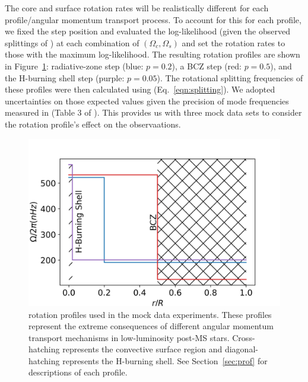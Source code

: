 The core and surface rotation rates will be realistically different for each profile/angular momentum transport process. To account for this for each profile, we fixed the step position and evaluated the log-likelihood (given the observed splittings of \thestar) at each combination of $(\Omega_c,\Omega_s)$ and set the rotation rates to those with the maximum log-likelihood. The resulting rotation profiles are shown in Figure~\ref{fig:5rotprof}: radiative-zone step (blue: $p = 0.2$), a BCZ step (red: $p = 0.5$), and the H-burning shell step (purple: $p = 0.05$).
The rotational splitting frequencies of these profiles were then calculated using  (Eq.~\ref{eqn:splitting}). 
We adopted uncertainties on those expected values given the precision of mode frequencies measured in \thestar{} (Table 3 of \citet{deheuvels_seismic_2014}). This provides us with three mock data sets to consider the rotation profile's effect on the observaations.


\begin{figure}
\centering
    \includegraphics[width=\textwidth]{Figures/subgiant_chapter_figures/rots.png}
    \caption{ rotation profiles used in the mock data experiments. These profiles represent the extreme consequences of different angular momentum transport mechanisms in low-luminosity post-MS stars. Cross-hatching represents the convective surface region and diagonal-hatching represents the H-burning shell. See Section~\ref{sec:prof} for descriptions of each profile.}
    \label{fig:5rotprof}
\end{figure}





